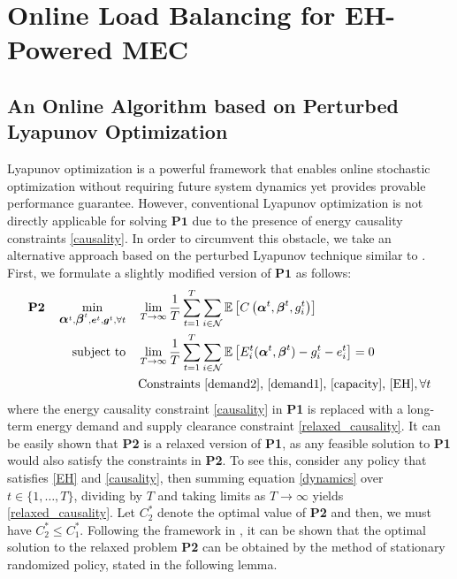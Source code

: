 \documentclass[12pt, draftclsnofoot, letterpaper, onecolumn]{IEEEtran}
\begin{document}
\section{Online Load Balancing for EH-Powered MEC}
\subsection{An Online Algorithm based on Perturbed Lyapunov Optimization}
Lyapunov optimization is a powerful framework that enables online stochastic optimization without requiring future system dynamics yet provides provable performance guarantee. However, conventional Lyapunov optimization \cite{neely2010stochastic} is not directly applicable for solving $\textbf{P1}$ due to the presence of energy causality constraints \eqref{causality}. In order to circumvent this obstacle, we take an alternative approach based on the perturbed Lyapunov technique similar to \cite{urgaonkar2011optimal}. First, we formulate a slightly modified version of $\textbf{P1}$  as follows:
\begin{subequations}
	\begin{align}
	\textbf{P2}~~~\min_{\mbox{\boldmath $\alpha$}^t, \mbox{\boldmath $\beta$}^t, {\boldsymbol{e}}^t, {\boldsymbol{g}}^t, \forall t} &~~~ \lim_{T\to\infty}\frac{1}{T}\sum_{t=1}^T\sum_{i\in\mathcal{N}} \mathbb{E}\left[C\left(\mbox{\boldmath $\alpha$}^t, \mbox{\boldmath $\beta$}^t, g^t_i\right)\right] \\
	\text{subject to} & ~~~ \lim_{T\to\infty}\frac{1}{T}\sum_{t=1}^T\sum_{i\in\mathcal{N}}\mathbb{E} \left[E_i^t(\mbox{\boldmath $\alpha$}^t, \mbox{\boldmath $\beta$}^t) - g^t_i - e^t_i\right]=0\label{relaxed_causality} \\
	&~~~\text{Constraints \eqref{demand2}, \eqref{demand1}, \eqref{capacity},  \eqref{EH}}, \forall t \nonumber
	\end{align}
\end{subequations}
where the energy causality constraint \eqref{causality} in \textbf{P1} is replaced with a long-term energy demand and supply clearance constraint \eqref{relaxed_causality}. It can be easily shown that \textbf{P2} is a relaxed version of \textbf{P1}, as any feasible solution to \textbf{P1} would also satisfy the constraints in \textbf{P2}. To see this, consider any policy that satisfies \eqref{EH} and \eqref{causality}, then summing  equation \eqref{dynamics} over $t \in \{1,\dots,T\}$, dividing by $T$ and taking limits as $T\rightarrow\infty$  yields \eqref{relaxed_causality}. Let $C^*_2$ denote the optimal value of \textbf{P2} and then, we must have $C^*_2\leq C^*_1$. Following the framework in \cite{neely2010stochastic}, it can be shown that the optimal solution to the relaxed problem \textbf{P2} can be obtained by the method of stationary randomized policy, stated in the following lemma.
\end{document}
